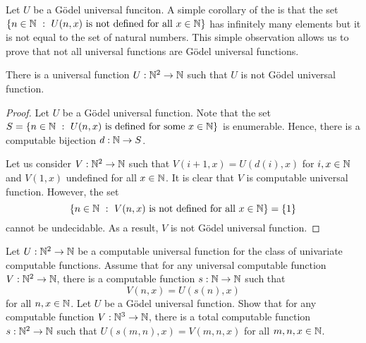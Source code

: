 Let $U$ be a G\"odel universal funciton.
A simple corollary of the  is that the set 
$\set[U(n, x) \text{ is not defined for all } x \in \N]{n \in \N}$ has
infinitely many elements but it is not equal to the set of natural numbers. This
simple observation allows us to prove that not all universal functions are
G\"odel universal functions.
\begin{theorem}
\label{theorem:universal-not-godel}
  There is a universal function $U : {\mathbb{N}}^2 \to {\mathbb{N}}$ such that $U$ is not  G\"odel
  universal function.
\end{theorem}
\begin{proof}
  Let $U$ be a G\"odel universal function. Note that the set 
  $S = \set[U(n, x) \text{ is defined for some } x \in \N]{n \in \N}$ is
  enumerable. Hence, there is a computable bijection $d : {\mathbb{N}} \to S$.

  Let us consider $V : {\mathbb{N}}^2 \to {\mathbb{N}}$ such that $V(i + 1, x) = U(d(i), x)$ for 
  $i, x \in {\mathbb{N}}$ and $V(1, x)$ undefined for all $x \in {\mathbb{N}}$. It is clear that $V$
  is computable universal function. However, the set 
  \[  
    \set[V(n, x) \text{ is not defined for all } x \in \N]{n \in \N} = \set{1}
  \]
  cannot be undecidable. As a result, $V$ is not G\"odel universal
  function.
\end{proof}

\begin{chapterendexercises}
  \exercise Let $U : {\mathbb{N}}^2 \to {\mathbb{N}}$ be a computable universal function for the
    class of univariate computable functions. Assume that for any universal
    computable function $V : {\mathbb{N}}^2 \to {\mathbb{N}}$, there is a computable function 
    $s : {\mathbb{N}} \to {\mathbb{N}}$ such that
    \[
      V(n, x) = U(s(n), x)
    \]
    for all $n, x \in {\mathbb{N}}$.
  \exercise Let $U$ be a G\"odel universal function. Show that for any
    computable function $V : {\mathbb{N}}^3 \to {\mathbb{N}}$, there is a total computable function
    $s : {\mathbb{N}}^2 \to {\mathbb{N}}$ such that $U(s(m, n), x) = V(m, n, x)$ for all $m, n, x
    \in {\mathbb{N}}$.
\end{chapterendexercises}
